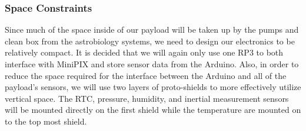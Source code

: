 \subsubsection{Space Constraints}
Since much of the space inside of our payload will be taken up by the pumps and clean box from the astrobiology systems, we need to design our electronics to be relatively compact.  It is decided that we will again only use one RP3 to both interface with MiniPIX and store sensor data from the Arduino.  Also, in order to reduce the space required for the interface between the Arduino and all of the payload's sensors, we will use two layers of proto-shields to more effectively utilize vertical space. The RTC, pressure, humidity, and inertial measurement sensors will be mounted directly on the first shield while the temperature are mounted on to the top most shield. 

